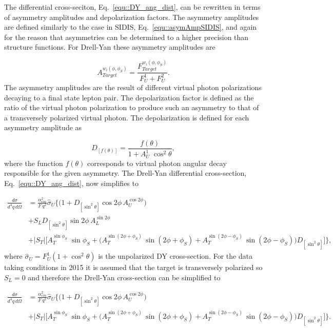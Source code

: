 The differential cross-seciton, Eq.~\ref{equ::DY_ang_dist}, can be rewritten in
terms of asymmetry amplitudes and depolarization factors.  The asymmetry
amplitudes are defined similarly to the case in SIDIS,
Eq.~\ref{equ::asymAmpSIDIS}, and again for the reason that asymmetries can be
determined to a higher precision than structure functions.  For Drell-Yan these
asymmetry amplitudes are

\begin{equation}
  A^{w_i(\phi, \phi_S)}_{Target} = \frac{F^{w_i(\phi,
      \phi_S)}_{Target}}{F_{U}^1+F_{U}^2}.
  \label{equ::asymAmpDY}
\end{equation}
\noindent
The asymmetry amplitudes are the result of different virtual photon
polarizations decaying to a final state lepton pair.  The depolarization factor
is defined as the ratio of the virtual photon polarization to produce such an
asymmetry to that of a transversely polarized virtual photon.  The
depolarization is defined for each asymmetry amplitude as

\begin{equation}
  D_{[f(\theta)]} = \frac{f(\theta)}{1+A_U^1\;\cos^2\theta},
  \label{equ::DYDepolarizationFactorDef}
\end{equation}
\noindent
where the function $f(\theta)$ corresponds to virtual photon angular decay
responsible for the given asymmetry.  The Drell-Yan differential cross-section,
Eq.~\ref{equ::DY_ang_dist}, now simplifies to~\cite{AKotzininaNote}

\begin{align}
  \label{equ::DY_usefulXsect}
  \frac{d\sigma}{d^4 q \, d \Omega} &=
  \frac{\alpha_{em}^2}{F \, q^2}\hat{\sigma}_U
  \Big \{ \Big(1 + D_{[\sin^2 \theta]} \cos 2\phi \, A_{U}^{\cos 2\phi} \Big)
 \nonumber \\
 &+ S_{L} D_{[\sin^2 \theta]} \sin 2\phi \, A_{L}^{\sin 2\phi}
   \nonumber \\
   &+ |S_{T}|
   \Big[A_{T}^{\sin \phi_S}\;\sin \phi_{S} 
     + \Big( A_{T}^{\sin (2\phi +\phi_S)}\, \sin(2\phi+\phi_S) +
     A_{T}^{\sin (2\phi - \phi_S)}\, \sin(2\phi-\phi_S) \Big)D_{[\sin ^2\theta]}
     \Big ]
   \Big \},
\end{align}
\noindent
where $\hat{\sigma}_U = F^1_U (1+\cos^2\theta)$ is the unpolarized DY
cross-section.  For the data taking conditions in 2015 it is assumed that the target is transversely polarized so $S_L = 0$ and therefore the Drell-Yan cross-section can be simplified to

\begin{align}
  \label{equ::DY_MostusefulXsect}
  \frac{d\sigma}{d^4 q \, d \Omega} &=
  \frac{\alpha_{em}^2}{F \, q^2}\hat{\sigma}_U
  \Big \{ \Big(1 + D_{[\sin^2 \theta]} \cos 2\phi \, A_{U}^{\cos 2\phi} \Big)
   \nonumber \\
   &+ |S_{T}|
   \Big[A_{T}^{\sin \phi_S}\;\sin \phi_{S} 
     + \Big( A_{T}^{\sin (2\phi +\phi_S)}\, \sin(2\phi+\phi_S) +
     A_{T}^{\sin (2\phi - \phi_S)}\, \sin(2\phi-\phi_S) \Big)D_{[\sin ^2\theta]}
     \Big ]
   \Big \}.
\end{align}

